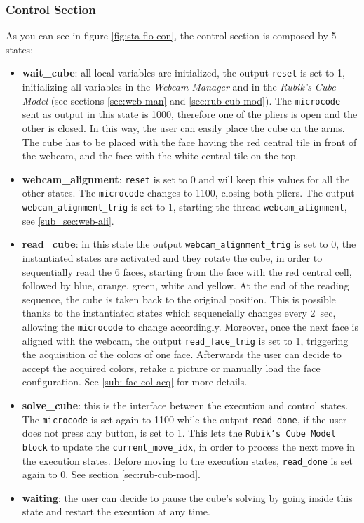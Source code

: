 \documentclass{report}
\begin{document}
\subsubsection{Control Section}
As you can see in figure \ref{fig:sta-flo-con}, the control section is composed by 5 states:
\begin{itemize}
\item \textbf{wait\_cube}: all local variables are initialized, the output \texttt{reset} is set to 1, initializing all variables in the \textit{Webcam Manager} and in the \textit{Rubik's Cube Model} (see sections \ref{sec:web-man} and \ref{sec:rub-cub-mod}). The \texttt{microcode} sent as output in this state is 1000, therefore one of the pliers is open and the other is closed. In this way, the user can easily place the cube on the arms. The cube has to be placed with the face having the red central tile in front of the webcam, and the face with the white central tile on the top.
\item \textbf{webcam\_alignment}: \texttt{reset} is set to 0 and will keep this values for all the other states. The \texttt{microcode} changes to 1100, closing both pliers. The output \texttt{webcam\_alignment\_trig} is set to 1, starting the thread \texttt{webcam\_alignment}, see \ref{sub_sec:web-ali}.
\item \textbf{read\_cube}: in this state the output \texttt{webcam\_alignment\_trig} is set to 0, the instantiated states are activated and they rotate the cube, in order to sequentially read the 6 faces, starting from the face with the red central cell, followed by blue, orange, green, white and yellow. At the end of the reading sequence, the cube is taken back to the original position. This is possible thanks to the instantiated states which sequencially changes every 2~sec, allowing the \texttt{microcode} to change accordingly. Moreover, once the next face is aligned with the webcam, the output \texttt{read\_face\_trig} is set to 1, triggering the acquisition of the colors of one face. Afterwards the user can decide to accept the acquired colors, retake a picture or manually load the face configuration. See \ref{sub: fac-col-acq} for more details.
\item \textbf{solve\_cube}: this is the interface between the execution and control states. The \texttt{microcode} is set again to 1100 while the output \texttt{read\_done}, if the user does not press any button, is set to 1. This lets the \texttt{Rubik's Cube Model block} to update the \texttt{current\_move\_idx}, in order to process the next move in the execution states. Before moving to the execution states, \texttt{read\_done} is set again to 0. See section \ref{sec:rub-cub-mod}.
\item \textbf{waiting}: the user can decide to pause the cube's solving by going inside this state and restart the execution at any time.
\end{itemize}
\end{document}
